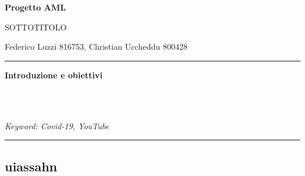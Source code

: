 \documentclass[10pt, a4paper,openany]{article}
\begin{document}
\begin{center}
\huge{\textbf{Progetto AML}}

SOTTOTITOLO
\end{center}

\begin{center}
Federico Luzzi 816753, Christian Uccheddu 800428
\end{center}

\hrule
\vspace{0.2cm}
\begin{center}\textbf{Introduzione e obiettivi}\end{center} 
\blindtext[1]
\\\\ \begin{small}
	\textit{Keyword: Covid-19, YouTube}
\end{small}
\vspace{0.2cm}
\hrule
\vspace{0.2cm}

\begin{multicols}{2}
	\section{uiassahn}
	\blindtext[4]
\end{multicols}
\end{document}

